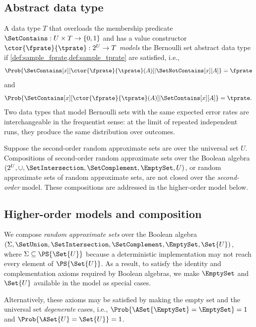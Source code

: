 \subsection{Abstract data type}
\label{sec:adt}
A data type $T$ that overloads the membership predicate $\SetContains : U \times T \to \{0,1\}$ and has a value constructor $\ctor{\fprate}{\tprate} : 2^U \to T$ \emph{models} the Bernoulli set abstract data type if \cref{def:sample_fprate,def:sample_tprate} are satisfied, i.e.,
\begin{equation}
	\Prob{\SetContains[x][\ctor{\fprate}{\tprate}(A)] | \SetNotContains[x][A]} = \fprate
\end{equation}
and
\begin{equation}
	\Prob{\SetContains[x][\ctor{\fprate}{\tprate}(A)] | \SetContains[x][A]} = \tprate.
\end{equation}
Two data types that model Bernoulli sets with the same expected error rates are interchangeable in the frequentist sense: at the limit of repeated independent runs, they produce the same distribution over outcomes.

Suppose the second-order random approximate sets are over the universal set $U$.
Compositions of second-order random approximate sets over the Boolean algebra $(2^U,\cup,\SetIntersection,\SetComplement,\EmptySet,U)$, or random approximate sets of random approximate sets, are not closed over the \emph{second-order} model.
These compositions are addressed in the higher-order model below.

\subsection{Higher-order models and composition}
\label{sec:higher_order_model}

We compose \emph{random approximate sets} over the Boolean algebra $(\Sigma,\SetUnion,\SetIntersection,\SetComplement,\EmptySet,\Set{U})$, where $\Sigma \subseteq \PS{\Set{U}}$ because a deterministic implementation may not reach every element of $\PS{\Set{U}}$.
As a result, to satisfy the identity and complementation axioms required by Boolean algebras, we make $\EmptySet$ and $\Set{U}$ available in the model as special cases.
\begin{remark}
	Alternatively, these axioms may be satisfied by making the empty set and the universal set \emph{degenerate} cases, i.e., $\Prob{\ASet{\EmptySet} = \EmptySet} = 1$ and $\Prob{\ASet{U} = \Set{U}} = 1$.
\end{remark}

